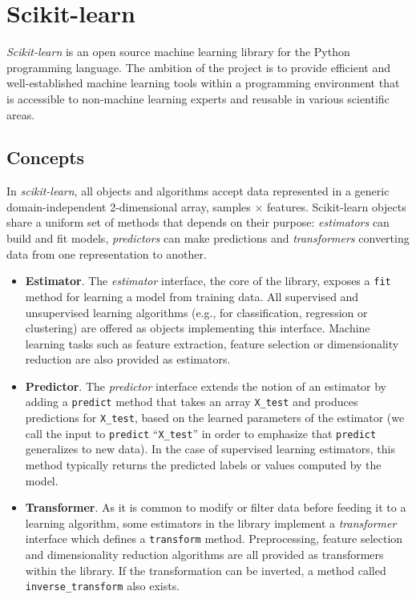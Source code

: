 \documentclass{frontiersSCNS} %
\begin{document}
\section{Scikit-learn}
\label{scikitlearn}

{\em Scikit-learn} \citep{pedregosa2011} is an open source machine
learning library for the Python programming language. The ambition of the
project is to provide efficient and well-established machine learning tools within
a programming environment that is accessible to non-machine learning experts
and reusable in various scientific areas.

\subsection{Concepts}

In {\em scikit-learn}, all objects and algorithms accept data represented
in a generic domain-independent 2-dimensional array, samples $\times$
features. Scikit-learn objects share a uniform set of methods that
depends on their purpose: \textit{estimators} can build and fit models,
\textit{predictors} can make predictions and \textit{transformers}
converting data from one representation to another.

\begin{itemize}
\item {\bf Estimator}. The \textit{estimator} interface, the core of the
    library, exposes a \texttt{fit} method for learning a model from training data.
    All supervised
    and unsupervised learning algorithms (e.g., for classification, regression or
    clustering) are offered as objects implementing this interface. Machine
    learning tasks such as feature extraction, feature selection or dimensionality
    reduction are also provided as estimators.

\item {\bf Predictor}. The \textit{predictor} interface extends the notion of an estimator
    by adding a \texttt{predict}
    method that takes an array \texttt{X\_test} and produces
    predictions for \texttt{X\_test}, based on the learned parameters of the
    estimator (we call the input to \texttt{predict} ``\texttt{X\_test}'' in order
    to emphasize that \texttt{predict} generalizes to new data). In the case of
    supervised learning estimators, this method typically returns the predicted
    labels or values computed by the model.

\item {\bf Transformer}. As it is common to modify or filter data before feeding it to a learning
    algorithm, some estimators in the library implement a \textit{transformer}
    interface which defines a \texttt{transform} method. Preprocessing, feature selection and
    dimensionality reduction
    algorithms are all provided as transformers within the library. If the transformation
    can be inverted, a method called \verb!inverse_transform! also exists.

\end{itemize}
\end{document}
